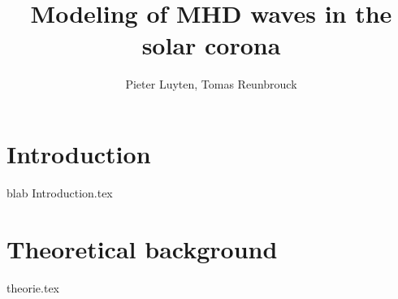 \documentclass[a4paper]{article}
\title{Modeling of MHD waves in the solar corona}
\author{Pieter Luyten, Tomas Reunbrouck}
\begin{document}
\maketitle
\newpage
\tableofcontents
\newpage

\section{Introduction}
blab
{Introduction.tex}
\cite{notes-fluid-dynamics}

\section{Theoretical background}
{theorie.tex}

\end{document}
